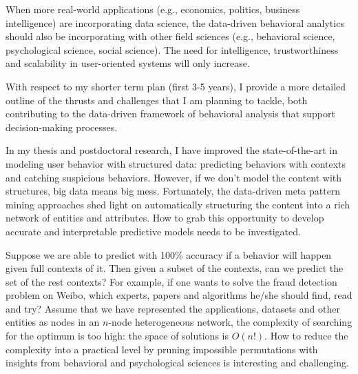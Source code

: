 \documentclass[10.5pt]{article}
\begin{document}
When more real-world applications (e.g., economics, politics, business intelligence) are incorporating data science, the data-driven behavioral analytics should also be incorporating with other field sciences (e.g., behavioral science, psychological science, social science). The need for intelligence, trustworthiness and scalability in user-oriented systems will only increase.

\vskip 0.08in
\vskip 0.01in

With respect to my shorter term plan (first 3-5 years), I provide a more detailed outline of the thrusts and challenges that I am planning to tackle, both contributing to the data-driven framework of behavioral analysis that support decision-making processes.

\vskip 0.02in
\vskip 0.01in

In my thesis and postdoctoral research, I have improved the state-of-the-art in modeling user behavior with structured data: predicting behaviors with contexts and catching suspicious behaviors. However, if we don't model the content with structures, big data means big mess. Fortunately, the data-driven meta pattern mining approaches shed light on automatically structuring the content into a rich network of entities and attributes. How to grab this opportunity to develop accurate and interpretable predictive models needs to be investigated.

Suppose we are able to predict with 100\% accuracy if a behavior will happen given full contexts of it. Then given a subset of the contexts, can we predict the set of the rest contexts? For example, if one wants to solve the fraud detection problem on Weibo, which experts, papers and algorithms he/she should find, read and try? Assume that we have represented the applications, datasets and other entities as nodes in an $n$-node heterogeneous network, the complexity of searching for the optimum is too high: the space of solutions is $O(n!)$. How to reduce the complexity into a practical level by pruning impossible permutations with insights from behavioral and psychological sciences is interesting and challenging.

\vskip 0.02in
\vskip 0.01in
\end{document}
